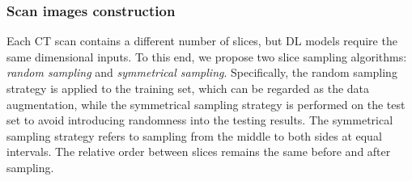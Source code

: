 \documentclass[letterpaper]{article}
\begin{document}
\subsubsection{Scan images construction}



















Each CT scan contains a different number of slices, but DL models require the same dimensional inputs. To this end, we propose two slice sampling algorithms: \textit{random sampling} and \textit{symmetrical sampling}. Specifically, the random sampling strategy is applied to the training set, which can be regarded as the data augmentation, while the symmetrical sampling strategy is performed on the test set to avoid introducing randomness into the testing results. The symmetrical sampling strategy refers to sampling from the middle to both sides at equal intervals. The relative order between slices remains the same before and after sampling.
\end{document}

